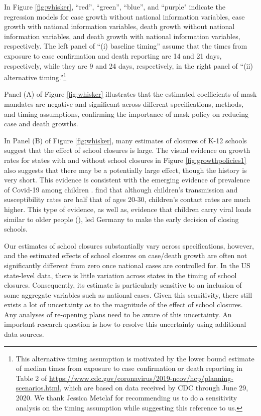 \documentclass[11pt,reqno,letter]{amsart}
\theoremstyle{definition}
\begin{document}
In Figure \ref{fig:whisker}, ``red'', ``green'', ``blue'', and ``purple" indicate the regression models for case growth without national information variables, case growth with national information variables, death growth without national information variables, and death growth with national information variables, respectively. The left panel of ``(i) baseline timing'' assume that the times from exposure to case confirmation and death reporting are 14 and 21 days, respectively,  while they are 9 and 24 days, respectively, in the right panel of ``(ii) alternative timing.''\footnote{This alternative timing assumption is motivated by the lower bound estimate of median times from exposure to case confirmation or death reporting in Table 2 of \url{https://www.cdc.gov/coronavirus/2019-ncov/hcp/planning-scenarios.html}, which are based on data received by CDC through June 29, 2020.  We thank Jessica Metclaf for recommending us to do a sensitivity analysis on the timing assumption while suggesting this reference to us.}
  

Panel (A) of Figure  \ref{fig:whisker} illustrates that the estimated coefficients of mask mandates are negative and significant across different specifications, methods, and timing assumptions, confirming the importance of mask policy on reducing case and death growths.  %

In Panel (B) of  Figure  \ref{fig:whisker}, many estimates of closures of K-12 schools  suggest that  the effect of school closures is large. The visual evidence on growth rates for states with and without school closures in Figure \ref{fig:growthpolicies1} also suggests that there may be a potentially large effect, though the history is very short.  This evidence is consistent
with the emerging evidence of prevalence of Covid-19 among children  \citep{Lee2020jama,Szablewski2020cdc}. \cite{children:nature} find that although children's
transmission and susceptibility rates are half that of ages 20-30,
children's contact rates are much higher.
This type of evidence, as well as, evidence that children carry viral
loads similar to older people (\cite{children:germany}), led Germany to make the early decision of closing schools.
 
Our estimates of school closures substantially vary  across  specifications, however, and the estimated effects of school closures on case/death growth are often not significantly different from zero once national cases are controlled for.
In the US state-level data,  there is little variation across states in the timing of school closures.  
Consequently, its estimate is particularly sensitive to an inclusion of some aggregate variables such as national cases.  Given this sensitivity,  there still exists a lot of uncertainty as to the magnitude of the effect of school closures.  Any analyses of re-opening plans need to be aware of this uncertainty.  An important research question is how to resolve this uncertainty using additional data sources. 
\end{document}
